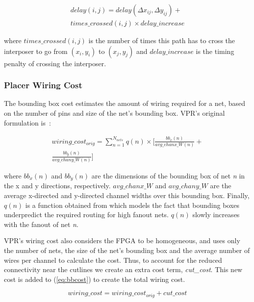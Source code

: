 \documentclass[journal]{IEEEtran}
\begin{document}
\setlength{\arraycolsep}{0.0em}
\begin{multline}
\label{eq:timing_cost}
delay(i,j) = delay(\Delta x_{ij}, \Delta y_{ij}) + \\
times\_crossed(i,j) \times delay\_increase
\end{multline}
\setlength{\arraycolsep}{5pt}

where $times\_crossed(i,j)$ is the number of times this path has to cross the interposer to go from $(x_i,y_i)$ to $(x_j,y_j)$ and $delay\_increase$ is the timing penalty of crossing the interposer.

\subsubsection{Placer Wiring Cost}
The bounding box cost estimates the amount of wiring required for a net, based on the number of pins and size of the net's bounding box. VPR's original formulation is~\cite{betz1997vpr}:

\setlength{\arraycolsep}{0.0em}
\begin{multline}
\label{eq:bbcost}
wiring\_cost_{orig} = \sum_{n=1}^{N_{nets}} q(n) \times [\frac{bb_x(n)}{avg\_chanx\_W(n)} + \\
\frac{bb_y(n)}{avg\_chany\_W(n)}]
\end{multline}
\setlength{\arraycolsep}{5pt}


where $bb_x(n)$ and $bb_y(n)$ are the dimensions of the bounding box of net \textit{n} in the x and y directions, respectively. $avg\_chanx\_W$ and $avg\_chany\_W$ are the average x-directed and y-directed channel widths over this bounding box. Finally, $q(n)$ is a function obtained from \cite{icann} which models the fact that bounding boxes underpredict the required routing for high fanout nets. $q(n)$ slowly increases with the fanout of net \textit{n}.

VPR's wiring cost also considers the FPGA to be homogeneous, and uses only the number of nets, the size of the net's bounding box and the average number of wires per channel to calculate the cost. Thus, to account for the reduced connectivity near the cutlines we create an extra cost term, \textit{cut\_cost}. This new cost is added to (\ref{eq:bbcost}) to create the total wiring cost.

\setlength{\arraycolsep}{0.0em}
\begin{equation}
\label{eq:total_wiring}
wiring\_cost = wiring\_cost_{orig} + cut\_cost
\end{equation}
\setlength{\arraycolsep}{5pt}
\end{document}
